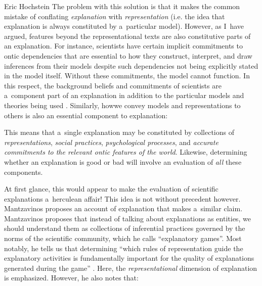 \begin{artengenv}{Eric Hochstein}
The problem with this solution is that it makes the common mistake of conflating \textit{explanation} with \textit{representation} (i.e. the idea that explanation is always constituted by a~particular model). However, as I~have argued, features beyond the representational texts are also constitutive parts of an explanation. For instance, scientists have certain implicit commitments to ontic dependencies that are essential to how they construct, interpret, and draw inferences from their models despite such dependencies not being explicitly stated in the model itself. Without these commitments, the model cannot function. In this respect, the background beliefs and commitments of scientists are a~component part of an explanation in addition to the particular models and theories being used
\parencites[see:][]{bokulich_representing_2018}[][]{hochstein_how_2019}. %
 Similarly, howwe convey models and representations to others is also an essential component to explanation:


This means that a~single explanation may be constituted by collections of \textit{representations}, \textit{social practices}, \textit{psychological processes}, and \textit{accurate commitments to the relevant ontic features of the world}. Likewise, determining whether an explanation is good or bad will involve an evaluation of \textit{all} these components.

At first glance, this would appear to make the evaluation of scientific explanations a~herculean affair! This idea is not without precedent however. Mantzavinos
\parencite*[][]{mantzavinos_explanatory_2016} %
 proposes an account of explanation that makes a~similar claim. Mantzavinos proposes that instead of talking about explanations as entities, we should understand them as collections of inferential practices governed by the norms of the scientific community, which he calls ``explanatory games''. Most notably, he tells us that determining ``which rules of representation guide the explanatory activities is fundamentally important for the quality of explanations generated during the game'' 
\parencite[][p.42]{mantzavinos_explanatory_2016}. %
 Here, the \textit{representational} dimension of explanation is emphasized. However, he also notes that:


\end{artengenv}
